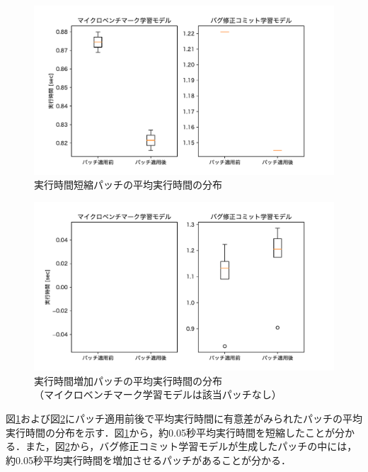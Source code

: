 \documentclass[submit,ses,noauthor]{ipsj}
\begin{document}
\begin{figure}[t]
\centering
\includegraphics[width=0.85\linewidth]{figure/speed_up_boxplot.pdf}
\vspace{-4mm}
\caption{実行時間短縮パッチの平均実行時間の分布}

\label{figure:execution speed up}
\end{figure}


\begin{figure}[t]
\centering
\includegraphics[width=0.85\linewidth]{figure/speed_down_boxplot.pdf}
\vspace{-4mm}
\caption{実行時間増加パッチの平均実行時間の分布\\（マイクロベンチマーク学習モデルは該当パッチなし）}
\vspace{-5mm}
\label{figure:execution speed down}
\end{figure}


図\ref{figure:execution speed up}および図\ref{figure:execution speed down}にパッチ適用前後で平均実行時間に有意差がみられたパッチの平均実行時間の分布を示す．図\ref{figure:execution speed up}から，約0.05秒平均実行時間を短縮したことが分かる．また，図\ref{figure:execution speed down}から，バグ修正コミット学習モデルが生成したパッチの中には，約0.05秒平均実行時間を増加させるパッチがあることが分かる．
\end{document}
